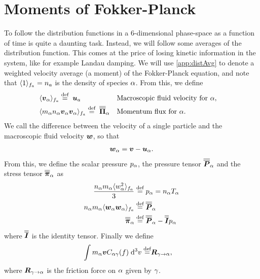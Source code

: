 \section{Moments of Fokker-Planck}
To follow the distribution functions in a 6-dimensional phase-space as a function of time is quite a daunting task.
Instead, we will follow some averages of the distribution function.
This comes at the price of losing kinetic information in the system, like for example Landau damping.
We will use \cref{app:distAvg} to denote a weighted velocity average (a moment) of the Fokker-Planck equation, and note that $\langle{1}\rangle_{f_a}=n_a$ is the density of species $\alpha$.
From this, we define
%
\begin{align*}
    &\langle{\boldsymbol{v}_\alpha}\rangle_{f_a} \overset{\text{def}}{=} \; \boldsymbol{u}_a&  &\text{Macroscopic fluid velocity for }\alpha,&\\
    &\langle{m_\alpha n_\alpha\boldsymbol{v}_\alpha\boldsymbol{v}_\alpha}\rangle_{f_a} \overset{\text{def}}{=}\; \boldsymbol{\overline{\overline{\Pi}}}_\alpha&  &\text{Momentum flux for }\alpha.&
\end{align*}
%
We call the difference between the velocity of a single particle and the macroscopic fluid velocity $\boldsymbol{w}$, so that
%
\begin{align*}
    \boldsymbol{w}_\alpha = \boldsymbol{v} - \boldsymbol{u}_\alpha.
\end{align*}
%
From this, we define the scalar pressure $p_\alpha$, the pressure tensor $\boldsymbol{\overline{\overline{P}}}_\alpha$ and the stress tensor $\boldsymbol{\overline{\overline{\pi}}}_\alpha$ as
%
\begin{align*}
    \frac{n_\alpha m_\alpha\langle{w_\alpha^2}\rangle_{f_a}}{3} \overset{\text{def}}{=}& \; p_\alpha = n_\alpha T_\alpha\\
    n_\alpha m_\alpha\langle{\boldsymbol{w}_{\alpha}\boldsymbol{w}_{\alpha}}\rangle_{f_a} \overset{\text{def}}{=}& \; \boldsymbol{\overline{\overline{P}}}_\alpha\\
    \boldsymbol{\overline{\overline{\pi}}}_\alpha \overset{\text{def}}{=}& \; \boldsymbol{\overline{\overline{P}}}_\alpha - \boldsymbol{\overline{\overline{I}}}p_\alpha\\
\end{align*}
%
where $\boldsymbol{\overline{\overline{I}}}$ is the identity tensor.
Finally we define
%
\begin{align*}
    \int {m_\alpha\boldsymbol{v} C_{\alpha\gamma}(f)} \; \text{d} {^3v} \overset{\text{def}}{=}& \boldsymbol{R}_{\gamma\to\alpha},
\end{align*}
%
where $\boldsymbol{R}_{\gamma\to\alpha}$ is the friction force on $\alpha$ given by $\gamma$.

